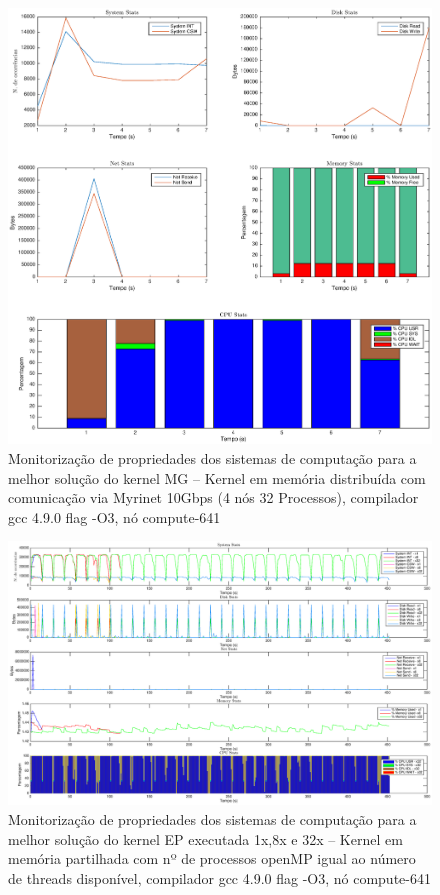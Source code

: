 \documentclass[conference,compsoc]{IEEEtran}
\begin{document}
\begin{figure}
\centering
\includegraphics[width=\textwidth]{EPS/DSTAT/MG_MPI_MX_GCC.eps}
\caption{Monitorização de propriedades dos sistemas de computação para a melhor solução do kernel MG -- Kernel em memória distribuída com comunicação via Myrinet 10Gbps (4 nós 32 Processos), compilador gcc 4.9.0 flag -O3, nó compute-641}
\label{dstat_mg}
\end{figure}

 \begin{figure}
\centering
\includegraphics[height=\textheight]{EPS/DSTAT/EP_32x.eps}
\caption{Monitorização de propriedades dos sistemas de computação para a melhor solução do kernel EP executada 1x,8x e 32x -- Kernel em memória partilhada com nº de processos openMP igual ao número de threads disponível, compilador gcc 4.9.0 flag -O3, nó compute-641}
\label{dstat_nvezes}
\end{figure}



\end{document}
